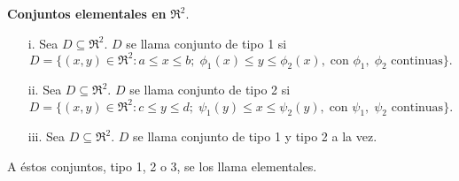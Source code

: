 \begin{definition}\textbf{Conjuntos elementales en }$\Re^2$.

    \begin{enumerate}
    \item[i.]Sea $D\subseteq\Re^2$. $D$ se llama conjunto de tipo 1 si
    \[
        D=\{(x,y)\in\Re^2: a\leq x\leq b;\;\phi_1(x)\leq y\leq \phi_2(x),\;\text{con }\phi_1,\;\phi_2\text{ continuas}\}.
    \]
    \item[ii.]
    Sea $D\subseteq\Re^2$. $D$ se llama conjunto de tipo 2 si
    \[
        D=\{(x,y)\in\Re^2: c\leq y\leq d;\;\psi_1(y)\leq x\leq \psi_2(y),\;\text{con }\psi_1,\;\psi_2\text{ continuas}\}.
    \]
    \item[iii.]
    Sea $D\subseteq\Re^2$. $D$ se llama conjunto de tipo 1 y tipo 2 a la vez.
    \end{enumerate}
    A \'estos conjuntos, tipo 1, 2 o 3, se los llama elementales.
\end{definition}

